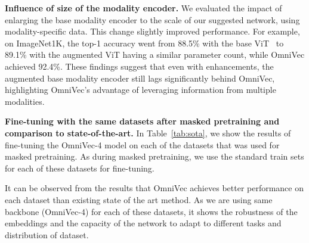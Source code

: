 \noindent\textbf{Influence of size of the modality encoder.} 
We evaluated the impact of enlarging the base modality encoder to the scale of our suggested network, using modality-specific data. This change slightly improved performance. For example, on ImageNet1K, the top-1 accuracy went from 88.5\% with the base ViT~\cite{dosovitskiy2020image} to 89.1\% with the augmented ViT having a similar parameter count, while OmniVec achieved 92.4\%. These findings suggest that even with enhancements, the augmented base modality encoder still lags significantly behind OmniVec, highlighting OmniVec's advantage of leveraging information from multiple modalities.

\noindent\textbf{Fine-tuning with the same datasets after masked pretraining and comparison to state-of-the-art.} In Table~\ref{tab:sota}, we show the results of fine-tuning the OmniVec-4 model on each of the datasets that was used for masked pretraining. As during masked pretraining, we use the standard train sets for each of these datasets for fine-tuning. 

It can be observed from the results that OmniVec achieves better performance on each dataset than existing state of the art method. As we are using same backbone (OmniVec-4) for each of these datasets, it shows the robustness of the embeddings and the capacity of the network to adapt to different tasks and distribution of dataset.

\begin{table}[h]
\centering
{}
\caption{\textbf{Comparison with state of the art} after fine tuning on respective training sets.}
\label{tab:sota}
\end{table}


